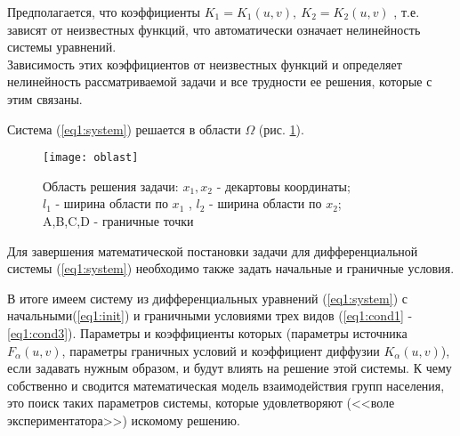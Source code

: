  Предполагается, что коэффициенты $K_{1} = K_{1}(u,v),\ K_{2} = K_{2}(u,v)$ , т.е. зависят от неизвестных функций, что автоматически означает нелинейность системы уравнений.\\ Зависимость этих коэффициентов от неизвестных функций и определяет нелинейность рассматриваемой задачи и все трудности ее решения, которые с этим связаны.

Система (\ref{eq1:system}) решается в области $\Omega$ (рис. \ref{fig:omega}).

\begin{figure}[ht!]
    \centering
    \texttt{[image: oblast]}
    \captionsetup{justification=centering,margin=2cm}
    \caption{Область решения задачи: $x_{1},x_{2}$ - декартовы координаты;\\ $l_{1}$ - ширина области по $x_{1}$ , $l_{2}$ - ширина области по $x_{2}$;\\ A,B,C,D - граничные точки}
    \label{fig:omega}
\end{figure}

Для завершения математической постановки задачи для дифференциальной системы (\ref{eq1:system}) необходимо также задать начальные и граничные условия.





В итоге имеем систему из дифференциальных уравнений (\ref{eq1:system}) с начальными(\ref{eq1:init})  и граничными условиями трех видов (\ref{eq1:cond1} - \ref{eq1:cond3}). Параметры и коэффициенты которых  (параметры источника $F_{\alpha}(u,v)$, параметры граничных условий и коэффициент диффузии $K_{\alpha}(u,v)$), если задавать нужным образом, и будут влиять на решение этой системы. К чему собственно и сводится математическая модель взаимодействия групп населения, это поиск таких параметров системы, которые удовлетворяют (<<воле экспериментатора>>) искомому решению.
